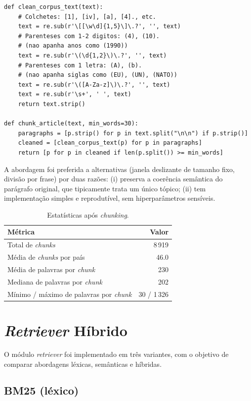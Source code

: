 \documentclass[11pt,a4paper]{article}
\begin{document}
\begin{lstlisting}[caption={Limpeza profunda aplicada a cada parágrafo.}]
def clean_corpus_text(text):
    # Colchetes: [1], [iv], [a], [4]., etc.
    text = re.sub(r'\[[\w\d]{1,5}\]\.?', '', text)
    # Parenteses com 1-2 digitos: (4), (10).
    # (nao apanha anos como (1990))
    text = re.sub(r'\(\d{1,2}\)\.?', '', text)
    # Parenteses com 1 letra: (A), (b).
    # (nao apanha siglas como (EU), (UN), (NATO))
    text = re.sub(r'\([A-Za-z]\)\.?', '', text)
    text = re.sub(r'\s+', ' ', text)
    return text.strip()

def chunk_article(text, min_words=30):
    paragraphs = [p.strip() for p in text.split("\n\n") if p.strip()]
    cleaned = [clean_corpus_text(p) for p in paragraphs]
    return [p for p in cleaned if len(p.split()) >= min_words]
\end{lstlisting}

A abordagem foi preferida a alternativas (janela deslizante de tamanho fixo, divisão por frase) por duas razões: (i) preserva a coerência semântica do parágrafo original, que tipicamente trata um único tópico; (ii) tem implementação simples e reprodutível, sem hiperparâmetros sensíveis.

\begin{table}[h]
\centering
\begin{tabular}{lr}
\toprule
\textbf{Métrica} & \textbf{Valor} \\
\midrule
Total de \emph{chunks} & 8\,919 \\
Média de \emph{chunks} por país & 46.0 \\
Média de palavras por \emph{chunk} & 230 \\
Mediana de palavras por \emph{chunk} & 202 \\
Mínimo / máximo de palavras por \emph{chunk} & 30 / 1\,326 \\
\bottomrule
\end{tabular}
\caption{Estatísticas após \emph{chunking}.}
\end{table}

\section{\emph{Retriever} Híbrido}

O módulo \emph{retriever} foi implementado em três variantes, com o objetivo de comparar abordagens léxicas, semânticas e híbridas.

\subsection{BM25 (léxico)}
\end{document}
